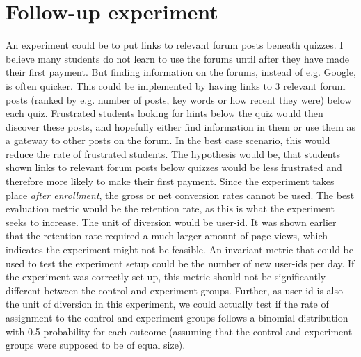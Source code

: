 \documentclass[12pt]{article}
\begin{document}
\section{Follow-up experiment}
An experiment could be to put links to relevant forum posts beneath quizzes.
\newline
I believe many students do not learn to use the forums until after they have made their first payment. But finding information on the forums, instead of e.g. Google, is often quicker.
\newline
This could be implemented by having links to 3 relevant forum posts (ranked by e.g. number of posts, key words or how recent they were) below each quiz. Frustrated students looking for hints below the quiz would then discover these posts, and hopefully either find information in them or use them as a gateway to other posts on the forum. In the best case scenario, this would reduce the rate of frustrated students.
\newline
The hypothesis would be, that students shown links to relevant forum posts below quizzes would be less frustrated and therefore more likely to make their first payment.
\newline
Since the experiment takes place \textit{after enrollment}, the gross or net conversion rates cannot be used. The best evaluation metric would be the retention rate, as this is what the experiment seeks to increase. The unit of diversion would be user-id. It was shown earlier that the retention rate required a much larger amount of page views, which indicates the experiment might not be feasible.
\newline
An invariant metric that could be used to test the experiment setup could be the number of new user-ids per day. If the experiment was correctly set up, this metric should not be significantly different between the control and experiment groups. Further, as user-id is also the unit of diversion in this experiment, we could actually test if the rate of assignment to the control and experiment groups follows a binomial distribution with 0.5 probability for each outcome (assuming that the control and experiment groups were supposed to be of equal size).
\end{document}
